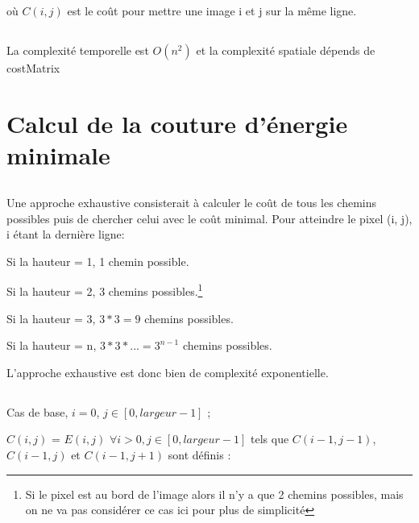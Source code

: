 \subsection{} %
	
	où $C(i,j)$ est le coût pour mettre 	une image i et j sur la même ligne. 
	
\subsection{} %
\subsection{} %



\subsection{} %
	La complexité temporelle est $O(n^2)$ et la complexité spatiale dépends de costMatrix

\setcounter{section}{0}

\section{Calcul de la couture d'énergie minimale} %
\subsection{} %
Une approche exhaustive consisterait à calculer le coût de tous les chemins possibles puis de chercher celui avec le coût minimal.
Pour atteindre le pixel (i, j), i étant la dernière ligne:

Si la hauteur = 1, 1 chemin possible.

Si la hauteur = 2, 3 chemins possibles.\footnote{Si le pixel est au bord de l'image alors il n'y a que 2 chemins possibles, mais on ne va pas considérer ce cas ici pour plus de simplicité}

Si la hauteur = 3, $3*3=9$ chemins possibles.

Si la hauteur = n, $3*3*...=3^{n-1}$ chemins possibles.

L'approche exhaustive est donc bien de complexité exponentielle.
\subsection{} %
Cas de base, $i = 0$, $j \in [0, largeur - 1]$ ;

 $C(i, j)$ = $E(i, j)$
\bigbreak
$\forall i > 0, j \in [0, largeur - 1]$ tels que $C(i - 1, j -1)$, $C(i - 1, j)$ et $C(i - 1, j + 1)$ sont définis :

